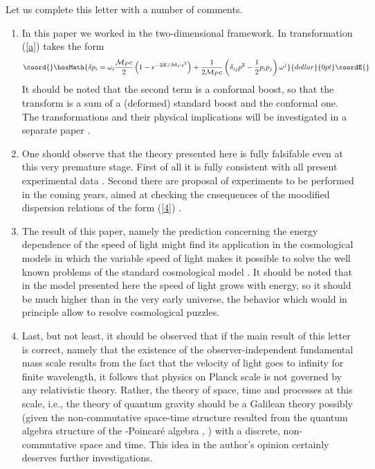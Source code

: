 \documentclass [11pt] {article}
\begin{document}
Let us complete this letter with a number of comments.
\begin{enumerate}
\item In this paper we worked in the two-dimensional framework. In
\coordHE{} transformation (\ref{a}) takes the form $$\coord{}\boxMath{\delta p_i =
\omega_{i}\frac{{\cal M}_P c}{2} \left( 1 - e^{-2 E/{\cal M}_P
 c^2}\right) +  \frac{1}{2{\cal M}_P c}\left(\delta_{ij} p^2
 - \frac12 p_ip_j\right)\omega^j}{dollar}{0pt}\coordE{}$$ It should be noted that the second term
 is a conformal boost, so that the transform is a sum of a
 (deformed) standard boost and the conformal one. The \coordHE{}
 transformations and their physical implications will be
 investigated in a separate paper \cite{RGJ}.
\item One should observe that the theory presented here is  fully
falsifable even at this very premature stage. First of all it is fully 
consistent with all present experimental data  \cite{grbgac}. Second there 
are proposal of experiments to be performed in the coming years, aimed at 
checking the cnsequences of the moodified dispersion relations of the form 
 (\ref{4}) \cite{glast}.
\item The result of this paper, namely the prediction concerning the 
energy dependence of the speed of light might find its application in the 
cosmological models in which the variable speed of light makes it possible 
to solve the well known problems of the standard cosmological model 
\cite{cosmo}. It should be noted that in the model presented here the speed  
of light grows with energy, so it should be much higher than \coordHE{} in the 
very early universe, the behavior which would  in principle allow to 
resolve cosmological puzzles. 
\item Last, but not least, it should be observed that if the main
result of this letter is correct, namely that the existence of the 
observer-independent fundamental mass  scale results from the fact that the 
velocity of light goes to infinity for finite wavelength, it follows that 
physics on Planck scale is not governed by any relativistic theory. Rather, 
the theory of space, time and processes at this scale, i.e., the theory of 
quantum gravity should be a Galilean theory possibly (given the 
non-commutative space-time structure resulted from the quantum algebra 
structure of the \myHighlight{$\kappa$}\coordHE{}-Poincar\'{e} algebra \cite{maru}, \cite{luruza}) with 
a discrete, non-commutative space and  time. This idea  in the author's 
opinion certainly deserves further investigations. 
\end{enumerate}
\end{document}
